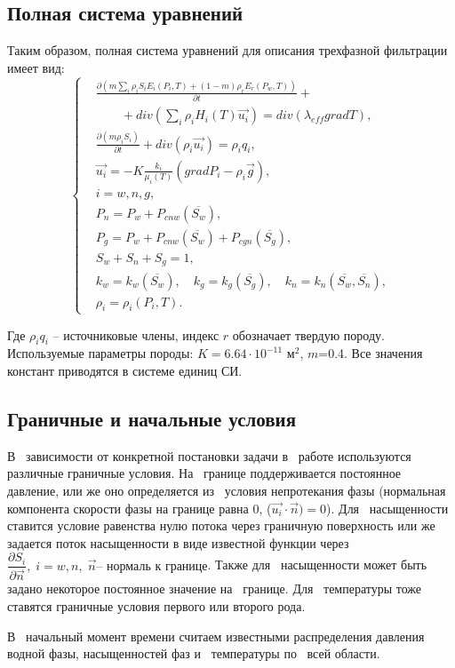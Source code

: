 \subsection{Полная система уравнений}
Таким образом, полная система уравнений для описания трехфазной фильтрации
имеет вид:
\begin{equation}
\left\{
  \begin{aligned}
    &\frac{\partial \left(m {\sum\limits_{i}{\rho_i S_i E_i(P_i, T)}} + (1-m){\rho_r E_r(P_w, T)}\right)}{\partial t} + \\
    & \qquad + div(\sum_{i}{\rho_i H_i(T) \overrightarrow{u_i}}) = div(\lambda_{eff} grad T), \\
    &\frac{\partial (m \rho_i S_i)}{\partial t}+ div(\rho_i \overrightarrow{u_i}) = \rho_i q_i, \\
    &\overrightarrow{u_i}=-K \frac{k_i}{{\mu_i(T)}}(grad P_i - {\rho}_i\overrightarrow{g}), \\
    &i=w,n,g, \\
    &P_n=P_w+P_{cnw}(\overline{S_w}), \\
    &P_g=P_w+P_{cnw}(\overline{S_w})+P_{cgn}(\overline{S_g}), \\
    &S_w + S_n + S_g=1, \\
    &k_w=k_w(\overline{S_w}),\quad k_g=k_g(\overline{S_g}),\quad k_n=k_n(\overline{S_w},\overline{S_n}), \\
    &\rho_i=\rho_i(P_i,T).
  \end{aligned}
\right.
\end{equation}

Где $\rho_i q_i$ -- источниковые члены, индекс $r$ обозначает твердую породу.
Используемые параметры породы: $K=6.64\cdot 10^{-11}$ м$^2$, $m$=0.4.
Все значения констант приводятся в системе единиц СИ.

\subsection{Граничные и начальные условия}
В~ зависимости от конкретной постановки задачи в~ работе используются различные
граничные условия. На~ границе поддерживается постоянное давление, или же оно
определяется из~ условия непротекания фазы (нормальная компонента скорости
фазы на границе равна 0, ($\overrightarrow{u_i} \cdot \overrightarrow{n}) = 0$).
Для~ насыщенности ставится условие равенства нулю потока через граничную 
поверхность или же задается поток насыщенности в виде известной функции через 
$ \dfrac{\partial S_i}{\partial \overrightarrow{n}}, \; i=w,n, \; \overrightarrow{n} \text{-- нормаль к границе} $.
Также для~ насыщенности может быть задано некоторое постоянное значение на~ границе.
Для~ температуры тоже ставятся граничные условия первого или второго рода. 

В~ начальный момент времени считаем известными распределения давления водной 
фазы, насыщенностей фаз и~ температуры по~ всей области.

